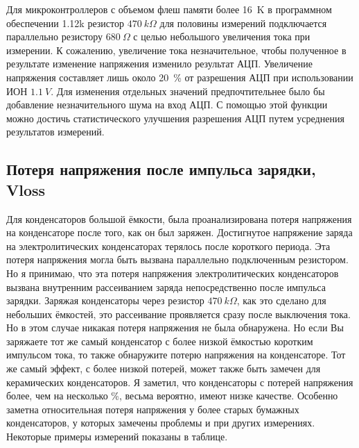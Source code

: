 Для микроконтроллеров с объемом флеш памяти более 16~K в программном обеспечении 1.12k резистор \(470~k\Omega\) 
для половины измерений подключается параллельно резистору \(680~\Omega\) с целью небольшого увеличения тока при измерении.
К сожалению, увеличение тока незначительное, чтобы полученное в результате изменение напряжения изменило результат АЦП.
Увеличение напряжения составляет лишь около 20~\% от разрешения АЦП при использовании ИОН \(1.1~V\).
Для изменения отдельных значений предпочтительнее было бы добавление незначительного шума на вход АЦП.
С помощью этой функции можно достичь статистического улучшения разрешения АЦП путем усреднения результатов измерений.


\subsection{Потеря напряжения после импульса зарядки, Vloss}
Для конденсаторов большой ёмкости, была проанализирована потеря напряжения на конденсаторе после того, как он был 
заряжен. Достигнутое напряжение заряда на  электролитических конденсаторах терялось после короткого периода. Эта 
потеря напряжения могла быть вызвана параллельно подключенным резистором. Но я принимаю, что эта потеря напряжения 
электролитических конденсаторов вызвана внутренним рассеиванием заряда непосредственно после импульса зарядки. 
Заряжая конденсаторы через резистор \(470~k\Omega\), как это сделано для небольших ёмкостей, это рассеивание 
проявляется сразу после выключения тока. Но в этом случае никакая потеря напряжения не была обнаружена. Но если 
Вы заряжаете тот же самый конденсатор с более низкой ёмкостью коротким импульсом тока, то также обнаружите потерю 
напряжения на конденсаторе. Тот же самый эффект, с более низкой потерей, может также быть замечен для керамических 
конденсаторов. Я заметил, что конденсаторы с потерей напряжения более, чем на несколько \%, весьма вероятно, имеют 
низке качестве. Особенно заметна относительная потеря напряжения у более старых бумажных конденсаторов, у которых 
замечены проблемы и при других измерениях. Некоторые примеры измерений показаны  в таблице.


